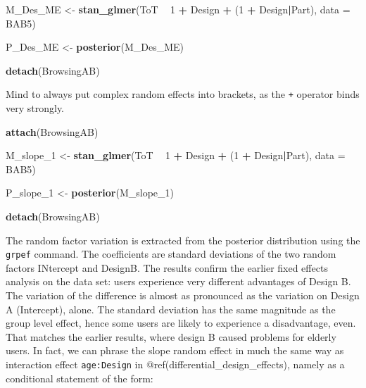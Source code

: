 \documentclass[]{svmono}
\newenvironment{Shaded}{\begin{snugshade}}{\end{snugshade}}
\newcommand{\KeywordTok}[1]{\textcolor[rgb]{0.13,0.29,0.53}{\textbf{#1}}}
\newcommand{\DataTypeTok}[1]{\textcolor[rgb]{0.13,0.29,0.53}{#1}}
\newcommand{\DecValTok}[1]{\textcolor[rgb]{0.00,0.00,0.81}{#1}}
\newcommand{\StringTok}[1]{\textcolor[rgb]{0.31,0.60,0.02}{#1}}
\newcommand{\OperatorTok}[1]{\textcolor[rgb]{0.81,0.36,0.00}{\textbf{#1}}}
\newcommand{\NormalTok}[1]{#1}
\theoremstyle{definition}
\theoremstyle{definition}
\theoremstyle{definition}
\theoremstyle{remark}
\begin{document}
\begin{Shaded}
\begin{Highlighting}[]
\NormalTok{M_Des_ME <-}\StringTok{ }\KeywordTok{stan_glmer}\NormalTok{(ToT }\OperatorTok{~}\StringTok{ }\DecValTok{1} \OperatorTok{+}\StringTok{ }\NormalTok{Design }\OperatorTok{+}\StringTok{ }\NormalTok{(}\DecValTok{1} \OperatorTok{+}\StringTok{ }\NormalTok{Design}\OperatorTok{|}\NormalTok{Part),}
                       \DataTypeTok{data =}\NormalTok{ BAB5)}
\end{Highlighting}
\end{Shaded}

\begin{Shaded}
\begin{Highlighting}[]
\NormalTok{P_Des_ME <-}\StringTok{ }\KeywordTok{posterior}\NormalTok{(M_Des_ME)}
\end{Highlighting}
\end{Shaded}

\begin{Shaded}
\begin{Highlighting}[]
\KeywordTok{detach}\NormalTok{(BrowsingAB)}
\end{Highlighting}
\end{Shaded}

Mind to always put complex random effects into brackets, as the
\texttt{+} operator binds very strongly.

\begin{Shaded}
\begin{Highlighting}[]
\KeywordTok{attach}\NormalTok{(BrowsingAB)}

\NormalTok{M_slope_}\DecValTok{1}\NormalTok{ <-}
\StringTok{  }\KeywordTok{stan_glmer}\NormalTok{(ToT }\OperatorTok{~}\StringTok{ }\DecValTok{1} \OperatorTok{+}\StringTok{ }\NormalTok{Design }\OperatorTok{+}\StringTok{ }\NormalTok{(}\DecValTok{1} \OperatorTok{+}\StringTok{ }\NormalTok{Design}\OperatorTok{|}\NormalTok{Part),}
             \DataTypeTok{data =}\NormalTok{ BAB5)}

\NormalTok{P_slope_}\DecValTok{1}\NormalTok{ <-}\StringTok{ }\KeywordTok{posterior}\NormalTok{(M_slope_}\DecValTok{1}\NormalTok{)}

\KeywordTok{detach}\NormalTok{(BrowsingAB)}
\end{Highlighting}
\end{Shaded}

The random factor variation is extracted from the posterior distribution
using the \texttt{grpef} command. The coefficients are standard
deviations of the two random factors INtercept and DesignB. The results
confirm the earlier fixed effects analysis on the data set: users
experience very different advantages of Design B. The variation of the
difference is almost as pronounced as the variation on Design A
(Intercept), alone. The standard deviation has the same magnitude as the
group level effect, hence some users are likely to experience a
disadvantage, even. That matches the earlier results, where design B
caused problems for elderly users. In fact, we can phrase the slope
random effect in much the same way as interaction effect
\texttt{age:Design} in @ref(differential\_design\_effects), namely as a
conditional statement of the form:
\end{document}
